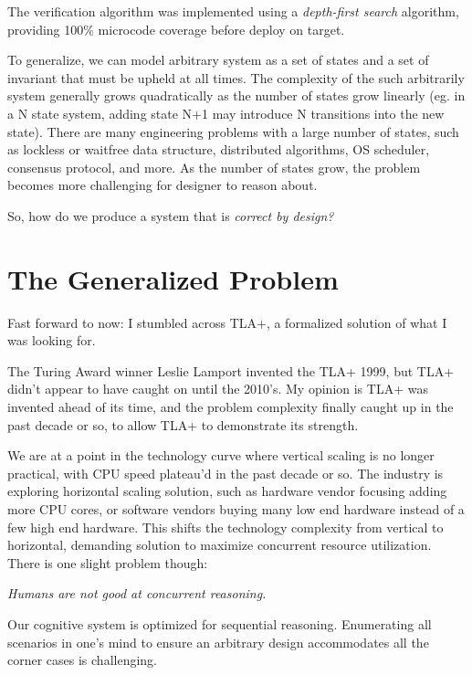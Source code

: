 The verification algorithm was implemented using a \textit{depth-first search}
algorithm, providing 100\% microcode coverage before deploy on target.\newline

To generalize, we can model arbitrary system as a set of states and a set
of invariant that must be upheld at all times. The complexity of the
such arbitrarily system generally grows quadratically as the number of states
grow linearly (eg. in a N state system, adding state N+1 may introduce N
transitions into the new state). There are many engineering problems with
a large number of states, such as lockless or waitfree data structure,
distributed algorithms, OS scheduler, consensus protocol, and more. As the
number of states grow, the problem becomes more challenging for designer to
reason about.\newline

So, how do we produce a system that is \textit{correct by design?} 

\section{The Generalized Problem}

Fast forward to now: I stumbled across TLA+, a formalized solution of what I was
looking for.\newline

The Turing Award winner Leslie Lamport invented the TLA+ 1999, but TLA+ didn't
appear to have caught on until the 2010's. My opinion is TLA+ was invented ahead
of its time, and the problem complexity finally caught up in the past decade or
so, to allow TLA+ to demonstrate its strength.\newline

We are at a point in the technology curve where vertical scaling is no longer
practical, with CPU speed plateau'd in the past decade or so. The industry is
exploring horizontal scaling solution, such as hardware vendor focusing adding
more CPU cores, or software vendors buying many low end hardware instead of a
few high end hardware. This shifts the technology complexity from vertical to
horizontal, demanding solution to maximize concurrent resource utilization.
There is one slight problem though:\newline

\textit{Humans are not good at concurrent reasoning}. \newline

Our cognitive system is optimized for sequential reasoning. Enumerating all
scenarios in one's mind to ensure an arbitrary design accommodates all the
corner cases is challenging.\newline

